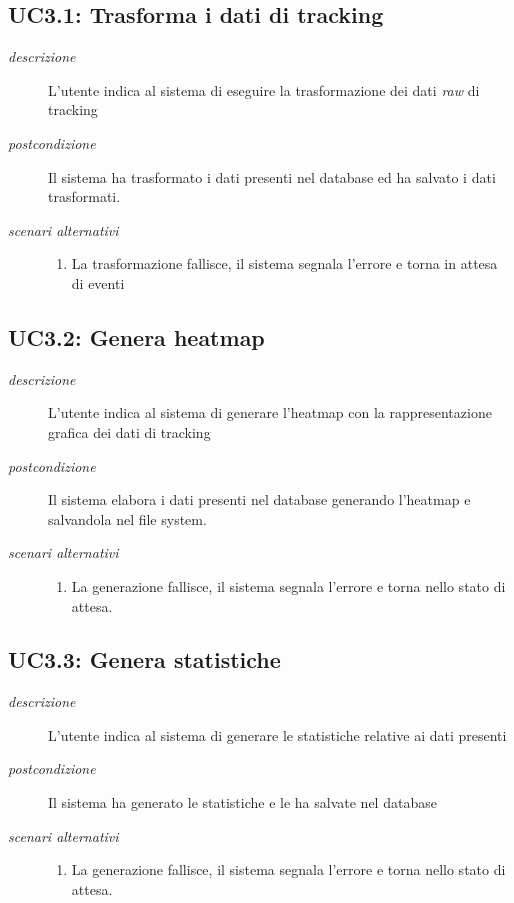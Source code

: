 \subsection{UC3.1: Trasforma i dati di tracking} \label{sec:UC3.1}
\begin{description}
\item[\em{descrizione }]L'utente indica al sistema di eseguire la trasformazione dei dati \textit{raw} di tracking
\item[\em{postcondizione }] Il sistema ha trasformato i dati presenti nel database ed ha salvato i dati trasformati.
\item[\em{scenari alternativi }] \mbox{} 
\begin{enumerate} 
\item La trasformazione fallisce, il sistema segnala l'errore e torna in attesa di eventi
\end{enumerate}
\end{description}

\subsection{UC3.2: Genera heatmap} \label{sec:UC3.2}
\begin{description}
\item[\em{descrizione }]L'utente indica al sistema di generare l'heatmap con la rappresentazione grafica dei dati di tracking
\item[\em{postcondizione }] Il sistema elabora i dati presenti nel database generando l'heatmap e salvandola nel file system.
\item[\em{scenari alternativi }] \mbox{} 
\begin{enumerate} 
\item La generazione fallisce, il sistema segnala l'errore e torna nello stato di attesa.
\end{enumerate}
\end{description}

\subsection{UC3.3: Genera statistiche} \label{sec:UC3.3}
\begin{description}
\item[\em{descrizione }]L'utente indica al sistema di generare le statistiche relative ai dati presenti
\item[\em{postcondizione }] Il sistema ha generato le statistiche e le ha salvate nel database
\item[\em{scenari alternativi }] \mbox{} 
\begin{enumerate} 
\item La generazione fallisce, il sistema segnala l'errore e torna nello stato di attesa.
\end{enumerate}
\end{description}

